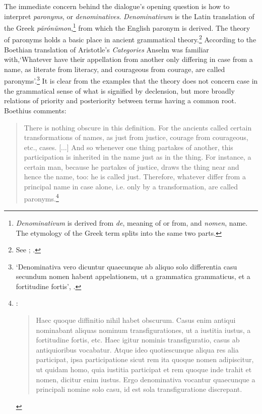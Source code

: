 \documentclass[]{article}
\begin{document}
The immediate concern behind the dialogue's opening question is how to interpret \textit{paronyms}, or \textit{denominatives}. \textit{Denominativum} is the Latin translation of the Greek \textit{p\u{a}r\'{o}n\u{u}mon},\footnote{\textit{Denominativum} is derived from \textit{de}, meaning of or from, and \textit{nomen}, name. The etymology of the Greek term splits into the same two parts.} from which the English paronym is derived. The theory of paronyms holds a basic place in ancient grammatical theory.\footnote{See \cite[BC 167D-168D]{BC}; \cite[inst. gram. IV]{inst.gram.}.} According to the Boethian translation of Aristotle's \textit{Categories} Anselm was familiar with,`Whatever have their appellation from another only differing in case from a name, as literate from literacy, and courageous from courage, are called paronyms'.\footnote{`Denominativa vero dicuntur quaecunque ab aliquo solo differentia casu secundum nomen habent appelationem, ut a grammatica grammaticus, et a fortitudine fortis', \cite[BC 167D]{BC}.} It is clear from the examples that the theory does not concern case in the grammatical sense of what is signified by declension, but more broadly relations of priority and posteriority between terms having a common root. Boethius comments:

\begin{quote}
There is nothing obscure in this definition. For the ancients called certain transformations of names, as just from justice, courage from courageous, etc., cases. [...] And so whenever one thing partakes of another, this participation is inherited in the name just as in the thing. For instance, a certain man, because he partakes of justice, draws the thing near and hence the name, too: he is called just. Therefore, whatever differ from a principal name in case alone, i.e. only by a transformation, are called paronyms.\footnote{\cite[BC 167D-168A]{BC}:
\begin{quote}
Haec quoque diffinitio nihil habet obscurum. Casus enim antiqui nominabant aliquas nominum transfigurationes, ut a iustitia iustus, a fortitudine fortis, etc. Haec igitur nominis transfiguratio, casus ab antiquioribus vocabatur. Atque ideo quotiescunque aliqua res alia participat, ipsa participatione sicut rem ita quoque nomen adipiscitur, ut quidam homo, quia iustitia participat et rem quoque inde trahit et nomen, dicitur enim iustus. Ergo denominativa vocantur quaecunque a principali nomine solo casu, id est sola transfiguratione discrepant.
\end{quote}}\end{quote}
\end{document}
